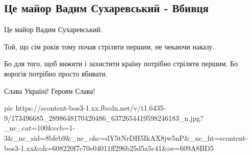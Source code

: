  
 
 
 
 

\subsection{Це майор Вадим Сухаревський - Вбивця}

Це майор Вадим Сухаревський.

Той, що сім років тому почав стріляти першим, не чекаючи наказу.

Бо для того, щоб вижити і захистити країну потрібно стріляти першим. Бо ворогів потрібно просто вбивати.

Слава Україні! Героям Слава!

\ifcmt
  pic https://scontent-bos3-1.xx.fbcdn.net/v/t1.6435-9/173496685_2898648170420486_6372654419598246183_n.jpg?_nc_cat=100&ccb=1-3&_nc_sid=8bfeb9&_nc_ohc=dY5tNrDH5IkAX8jw5nP&_nc_ht=scontent-bos3-1.xx&oh=608220f7c70e04011ff296b25d5a5c41&oe=609A8BD5
\fi

